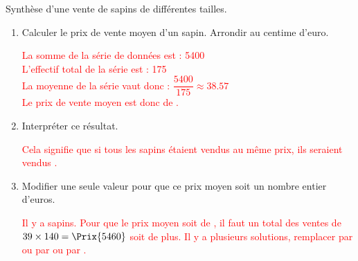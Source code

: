\begin{corrige}
    Synthèse d'une vente de sapins de différentes tailles.
    \par\smallskip
    \hspace*{-10mm}
    \par\smallskip
    \hspace*{-10mm}
    \par\smallskip
    \begin{enumerate}
        \item Calculer le prix de vente moyen d'un sapin. Arrondir au centime d'euro.
        \par\smallskip
        \textcolor{red}{
            La somme de la série de données est : \num{5400}\\
            L'effectif total de la série est : \num{175}\\
            La moyenne de la série vaut donc : $\dfrac{\num{5400}}{175}\approx \num{38.57}$\\\smallskip
            Le prix de vente moyen est donc de .
        }
        \item Interpréter ce résultat.
        \par\smallskip
        \textcolor{red}{Cela signifie que si tous les sapins étaient vendus au même prix, ils seraient vendus .}
        \item Modifier une seule valeur pour que ce prix moyen soit un nombre entier d'euros.
        \par\smallskip
        \textcolor{red}{
            Il y a \EffectifTotal sapins. Pour que le prix moyen soit de , il faut un total des ventes de $39\times 140=\Prix{5460}$
            soit  de plus. Il y a plusieurs solutions, remplacer  par  ou  par  ou  par .
        }
    \end{enumerate}
\end{corrige}

